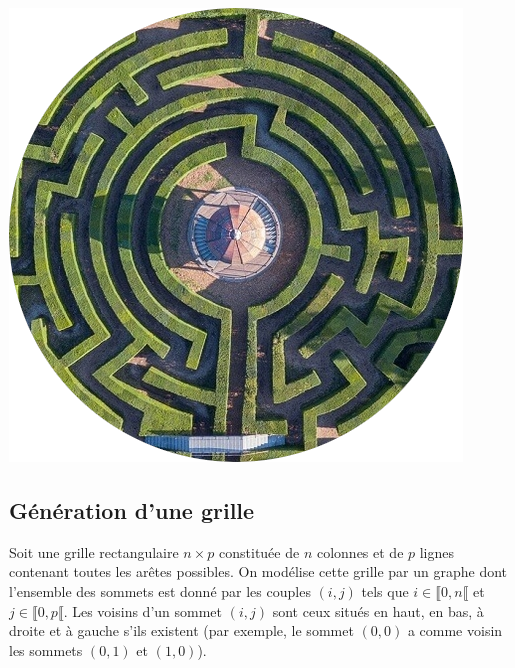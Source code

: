 %


\begin{marginfigure}
\includegraphics[width=\linewidth]{fig_00.png}
\end{marginfigure}





\subsection*{Génération d'une grille}

Soit une grille rectangulaire $n\times p$ constituée de $n$ colonnes et de $p$ lignes contenant toutes les arêtes possibles. On modélise cette grille par un graphe dont l'ensemble des sommets est donné par les couples $(i,j)$ tels que $i\in\llbracket 0,n \llbracket $ et $j\in\llbracket 0,p \llbracket $. Les voisins d'un sommet $(i,j)$ sont ceux situés en haut, en bas, à droite et à gauche s'ils existent (par exemple, le sommet $(0,0)$ a comme voisin les sommets $(0,1)$ et $(1,0)$).



